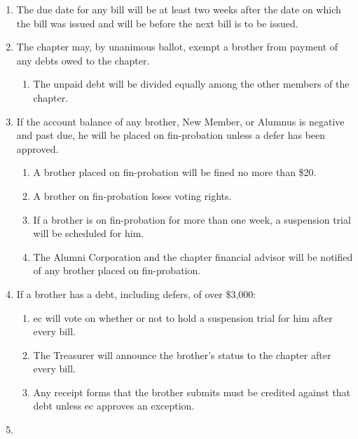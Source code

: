 \documentclass[]{article}
\begin{document}
	\begin{enumerate}
		\item The due date for any bill will be at least two weeks after the date on which the bill was issued and will be before the next bill is to be issued.

		\item The chapter may, by unanimous ballot, exempt a brother from payment of any debts owed to the chapter.
			\begin{enumerate}
				\item The unpaid debt will be divided equally among the other members of the chapter.
			\end{enumerate}

		\item If the account balance of any brother, New Member, or Alumnus is negative and past due, he will be placed on \gls{fin-probation} unless a \gls{defer} has been approved.
		\label{fin-probation}
			\begin{enumerate}
				\item A brother placed on \gls{fin-probation} will be fined no more than \$20.
				\item A brother on \gls{fin-probation} loses voting rights.
				\item If a brother is on \gls{fin-probation} for more than one week, a suspension trial will be scheduled for him.
				\item The Alumni Corporation and the chapter financial advisor will be notified of any brother placed on \gls{fin-probation}.
			\end{enumerate}

		\item If a brother has a debt, including \glspl{defer}, of over \$3,000:
			\begin{enumerate}
				\item \Gls{ec} will vote on whether or not to hold a suspension trial for him after every bill.
				\item The Treasurer will announce the brother's status to the chapter after every bill.
				\item Any receipt forms that the brother submits must be credited against that debt unless \gls{ec} approves an exception.
			\end{enumerate}
		\item
	\end{enumerate}
\end{document}
